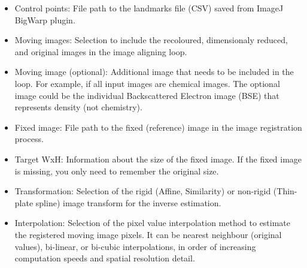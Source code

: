 	\begin{itemize}
		
		\item Control points: File path to the landmarks file (CSV) saved from ImageJ BigWarp plugin.
		\item Moving images: Selection to include the recoloured, dimensionaly reduced, and original images in the image aligning loop.
		\item Moving image (optional): Additional image that needs to be included in the loop. For example, if all input images are chemical images. The optional image could be the individual Backscattered Electron image (BSE) that represents density (not chemistry). 
		\item Fixed image: File path to the fixed (reference) image in the image registration process.
		\item Target WxH: Information about the size of the fixed image. If the fixed image is missing, you only need to remember the original size.
		\item Transformation: Selection of the rigid (Affine, Similarity) or non-rigid (Thin-plate spline) image transform for the inverse estimation.
		\item Interpolation: Selection of the pixel value interpolation method to estimate the registered moving image pixels. It can be nearest neighbour (original values), bi-linear, or bi-cubic interpolations, in order of increasing computation speeds and spatial resolution detail.		
		
	\end{itemize}
		
